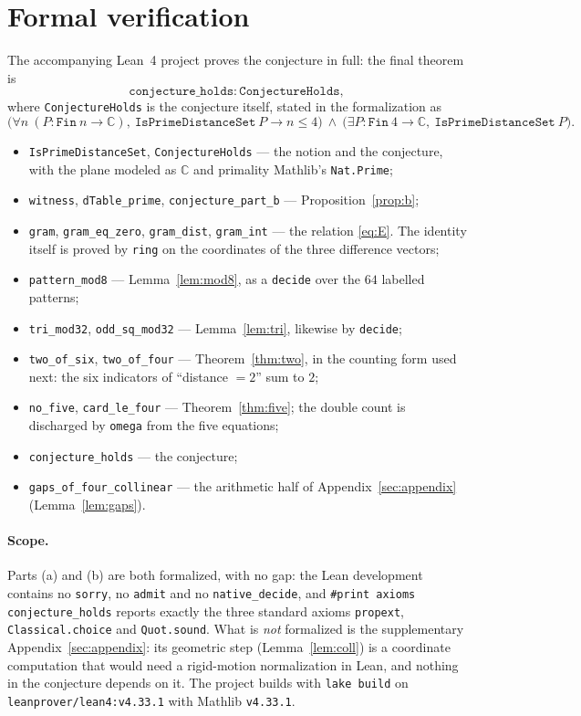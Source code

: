 \documentclass[11pt]{article}
\theoremstyle{plain}
\theoremstyle{definition}
\theoremstyle{remark}
\begin{document}
\section{Formal verification}

The accompanying Lean~4 project proves the conjecture in full: the final theorem
is
\[
  \texttt{conjecture\_holds} : \texttt{ConjectureHolds},
\]
where \texttt{ConjectureHolds} is the conjecture itself, stated in the
formalization as
\[
  \bigl(\forall n\ (P:\texttt{Fin}\ n\to\mathbb C),\
    \texttt{IsPrimeDistanceSet}\ P\to n\le4\bigr)
  \ \wedge\
  \bigl(\exists P:\texttt{Fin}\ 4\to\mathbb C,\ \texttt{IsPrimeDistanceSet}\ P\bigr).
\]

\begin{itemize}
  \item \texttt{IsPrimeDistanceSet}, \texttt{ConjectureHolds} --- the notion and
    the conjecture, with the plane modeled as $\mathbb C$ and primality
    Mathlib's \texttt{Nat.Prime};
  \item \texttt{witness}, \texttt{dTable\_prime}, \texttt{conjecture\_part\_b}
    --- Proposition~\ref{prop:b};
  \item \texttt{gram}, \texttt{gram\_eq\_zero}, \texttt{gram\_dist},
    \texttt{gram\_int} --- the relation \eqref{eq:E}. The identity itself is
    proved by \texttt{ring} on the coordinates of the three difference vectors;
  \item \texttt{pattern\_mod8} --- Lemma~\ref{lem:mod8}, as a \texttt{decide}
    over the $64$ labelled patterns;
  \item \texttt{tri\_mod32}, \texttt{odd\_sq\_mod32} ---
    Lemma~\ref{lem:tri}, likewise by \texttt{decide};
  \item \texttt{two\_of\_six}, \texttt{two\_of\_four} ---
    Theorem~\ref{thm:two}, in the counting form used next: the six indicators
    of ``distance $=2$'' sum to $2$;
  \item \texttt{no\_five}, \texttt{card\_le\_four} --- Theorem~\ref{thm:five};
    the double count is discharged by \texttt{omega} from the five equations;
  \item \texttt{conjecture\_holds} --- the conjecture;
  \item \texttt{gaps\_of\_four\_collinear} --- the arithmetic half of
    Appendix~\ref{sec:appendix} (Lemma~\ref{lem:gaps}).
\end{itemize}

\paragraph{Scope.} Parts (a) and (b) are both formalized, with no gap: the Lean
development contains no \texttt{sorry}, no \texttt{admit} and no
\texttt{native\_decide}, and \texttt{\#print axioms conjecture\_holds} reports
exactly the three standard axioms \texttt{propext}, \texttt{Classical.choice}
and \texttt{Quot.sound}. What is \emph{not} formalized is the supplementary
Appendix~\ref{sec:appendix}: its geometric step (Lemma~\ref{lem:coll}) is a
coordinate computation that would need a rigid-motion normalization in Lean, and
nothing in the conjecture depends on it. The project builds with \texttt{lake
build} on \texttt{leanprover/lean4:v4.33.1} with Mathlib \texttt{v4.33.1}.
\end{document}
